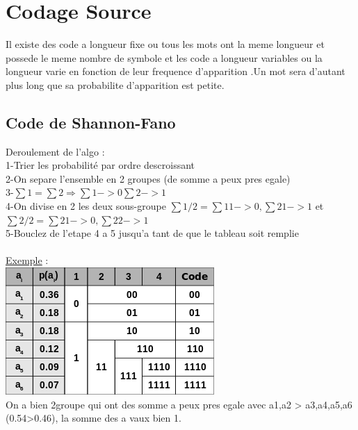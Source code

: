 \documentclass[a4paper,8pt,openany]{book}
\begin{document}
\section{Codage Source}
Il existe des code a longueur fixe ou tous les mots ont la meme longueur et possede le meme nombre de symbole et les code a longueur variables ou la longueur varie en fonction de leur frequence d'apparition .Un mot sera d'autant plus long que sa probabilite d'apparition est  petite.\\

\subsection{Code de Shannon-Fano}
Deroulement de l'algo :\\
1-Trier les probabilit\'e par ordre descroissant\\
2-On separe l'ensemble en 2 groupes (de somme a peux pres egale)\\
3-$\sum1 = \sum2 \Rightarrow \sum1->0 \sum2->1$\\
4-On divise en 2 les deux sous-groupe $\sum1/2 = \sum11->0 , \sum21->1 $ et $ \sum2/2 = \sum21->0 , \sum22->1$\\
5-Bouclez de l'etape 4 a 5 jusqu'a tant de que le tableau soit remplie\\
\\
\underline{Exemple} : \\
\includegraphics[width=0.75\linewidth]{img/code_shannon_fano.png}
\\
On a bien 2groupe qui ont des somme a peux pres egale avec a1,a2 > a3,a4,a5,a6 (0.54>0.46), la somme des a vaux bien 1.\\
\end{document}
